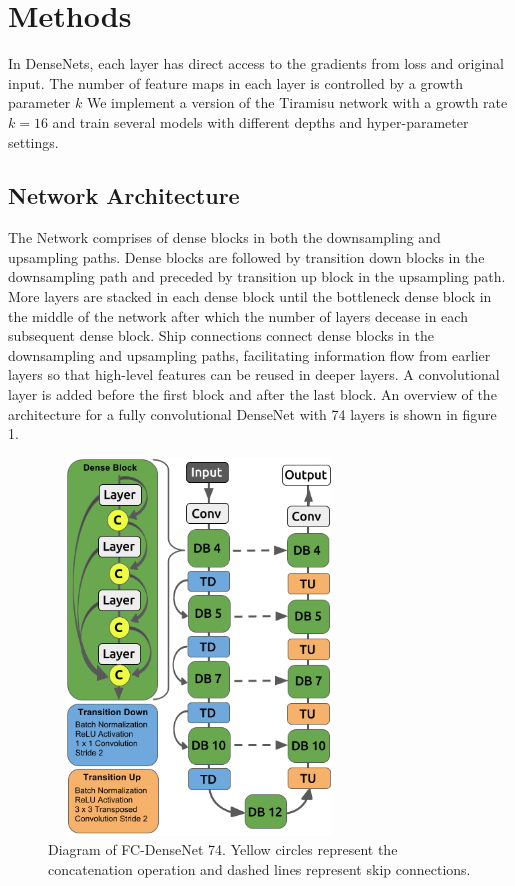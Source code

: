 \documentclass{llncs}
\begin{document}
\section{Methods}

In DenseNets, each layer has direct access to the gradients from loss and original input. The number of feature maps in each layer is controlled by a growth parameter $k$ We implement a version of the Tiramisu network \cite{Tiramisu} with a growth rate $k = 16$ and train several models with different depths and hyper-parameter settings. 

\subsection{Network Architecture}
The Network comprises of dense blocks in both the downsampling and upsampling paths. Dense blocks are followed by transition down blocks in the downsampling path and preceded by transition up block in the upsampling path. More layers are stacked in each dense block until the bottleneck dense block in the middle of the network after which the number of layers decease in each subsequent dense block. Ship connections connect dense blocks in the downsampling and upsampling paths, facilitating information flow from earlier layers so that high-level features can be reused in deeper layers. A convolutional layer is added before the first block and after the last block. An overview of the architecture for a fully convolutional DenseNet with 74 layers is shown in figure 1.

\begin{figure}
\centering
\includegraphics[width=8cm, height=10cm]{densenet}
\caption{Diagram of FC-DenseNet 74. Yellow circles represent the concatenation operation and dashed lines represent skip connections.}
\end{figure}
\end{document}

